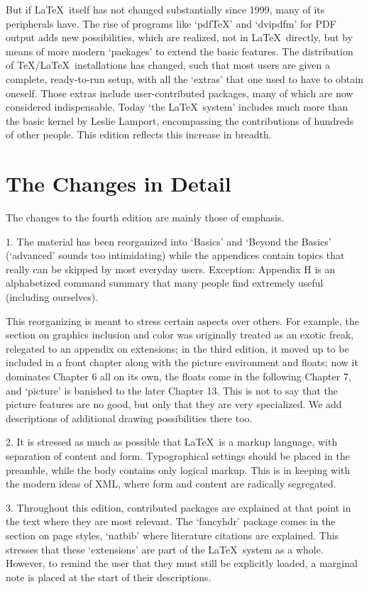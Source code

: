 \documentclass[twoside]{report}
\begin{document}
But if \LaTeX\ itself has not changed substantially since 1999, many of its
peripherals have. The rise of programs like `pdf\TeX'  and `dvipdfm' for
PDF output adds new possibilities, which are realized, not in \LaTeX\
directly, but by means of more modern `packages' to extend the basic
features. The distribution of \TeX/\LaTeX\ installations has changed, such
that most users are given a complete, ready-to-run setup, with all the
`extras' that one used to have to obtain oneself. Those extras include
user-contributed packages, many of which are now considered indispensable.
Today `the \LaTeX\ system' includes much more than the basic kernel by Leslie
Lamport, encompassing the contributions of hundreds of other people. This
edition reflects this increase in breadth.

\section{The Changes in Detail}
The changes to the fourth edition are mainly those of emphasis.

1. The material has been reorganized into `Basics' and `Beyond the Basics'
  (`advanced' sounds too intimidating) while the appendices contain
  topics that really can be skipped by most everyday users. Exception:
  Appendix H is an alphabetized command summary that many
  people find extremely useful (including ourselves).

  This reorganizing is meant to stress certain aspects over others. For
  example, the section on graphics inclusion and color was originally
  treated as an exotic freak, relegated to an appendix on extensions; in the
  third edition, it moved up to be included in a front chapter along with the
  picture environment and floats; now it dominates
  Chapter 6 all on its own, the floats come in the following
  Chapter 7, and `picture' is banished to the later
  Chapter 13. This is not to say that the picture features are no good,
  but only that they are very specialized. We add
  descriptions of additional drawing possibilities there too.

2. It is stressed as much as possible that \LaTeX\ is a markup language,
  with separation of content and form. Typographical settings
  should be placed in the preamble, while the body contains only logical
  markup. This is in keeping with the modern ideas of XML, where form and
  content are radically segregated.

3. Throughout this edition, contributed packages are explained at that point
  in the text where they are most relevant. The `fancyhdr' package
  comes in the section on page styles, `natbib' where literature
  citations are explained. This stresses that these `extensions' are part of
  the \LaTeX\ system as a whole. However, to remind the user that they must
  still be explicitly loaded, a marginal note is placed at the start of their
  descriptions.
\end{document}
